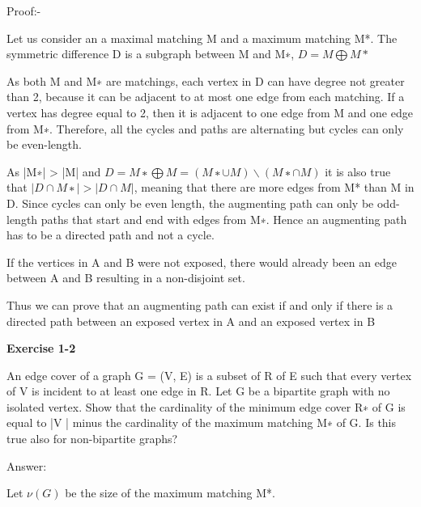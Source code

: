 \documentclass[twoside]{article}
\begin{document}
\begin{flushleft}Proof:-\end{flushleft}
\begin{flushleft}Let us consider an a maximal matching M and a maximum matching M*. The symmetric difference D is a subgraph between M and M∗, $D = M \bigoplus M*$  \end{flushleft}
\begin{flushleft} As both M and M∗ are matchings, each vertex in D can have degree not greater than 2, because it can be adjacent to at most one edge from each matching. If a vertex has degree equal to 2, then it is adjacent to one edge from M and one edge from M∗. Therefore, all the cycles and paths are alternating but cycles can only be even-length.\end{flushleft}
\begin{flushleft} As |M∗| > |M| and $ D = M∗ \bigoplus  M = (M∗ ∪ M) \backslash (M∗ ∩ M) $ it is also true that $|D ∩ M∗| > |D ∩ M|$, meaning that there are more edges from M* than M in D. Since cycles can only be even length, the augmenting path can only be odd-length paths that start and end with edges from M∗. Hence an augmenting path has to be a directed path and not a cycle. \end{flushleft}
\begin{flushleft} If the vertices in A and B were not exposed, there would already been  an edge between A and B resulting in a non-disjoint set. \end{flushleft}
\begin{flushleft} Thus we can prove that an augmenting path can exist if and only if there is a directed path between an exposed vertex in A and an exposed vertex in B \end{flushleft}
\begin{flushleft}\textbf{Exercise 1-2}\end{flushleft}
\begin{flushleft}An edge cover of a graph G = (V, E) is a subset of R of E such that every vertex of V is incident to at least one edge in R. Let G be a bipartite graph with no isolated vertex.  Show that the cardinality of the minimum edge cover R∗ of G is equal to |V | minus the cardinality of the maximum matching M∗ of G. 
Is this true also for non-bipartite graphs? \end{flushleft}
\begin{flushleft} Answer:\end{flushleft}
\begin{flushleft} 
Let  $\nu(G)$ be the size of the maximum matching M*. \end{flushleft}
\end{document}

